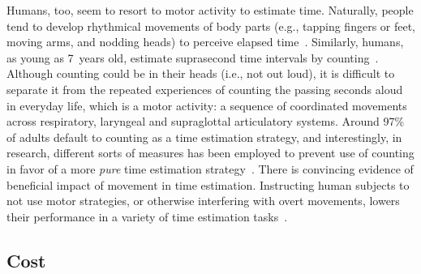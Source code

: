 \par
Humans, too, seem to resort to motor activity to estimate time.
Naturally, people tend to develop rhythmical movements of body parts (e.g., tapping fingers or feet, moving arms, and nodding heads) to perceive elapsed time~\cite{Merchant2016CurrOp}.
Similarly, humans, as young as 7~years old, estimate suprasecond time intervals by counting~\cite{Wilkening1987, Rakitin1998}.
Although counting could be in their heads (i.e., not out loud), it is difficult to separate it from the repeated experiences of counting the passing seconds aloud in everyday life, which is a motor activity:
    a sequence of coordinated movements across respiratory, laryngeal and supraglottal articulatory systems.
Around 97\% of adults default to counting as a time estimation strategy, and interestingly, in research, different sorts of measures has been employed to prevent use of counting in favor of a more \textit{pure} time estimation strategy~\cite{Rattat2012}.\footnotemark
{}
There is convincing evidence of beneficial impact of movement in time estimation.
Instructing human subjects to not use motor strategies, or otherwise interfering with overt movements, lowers their performance in a variety of time estimation tasks~\cite{Morillon2017PNAS, Wiener2019eNeuro, Meegan2000, Rakitin1998, Fautrelle2015PlosOne, Monier2019DevSci}.










\subsection{Cost}
\label{ch:intro:Embodiment:cost}




